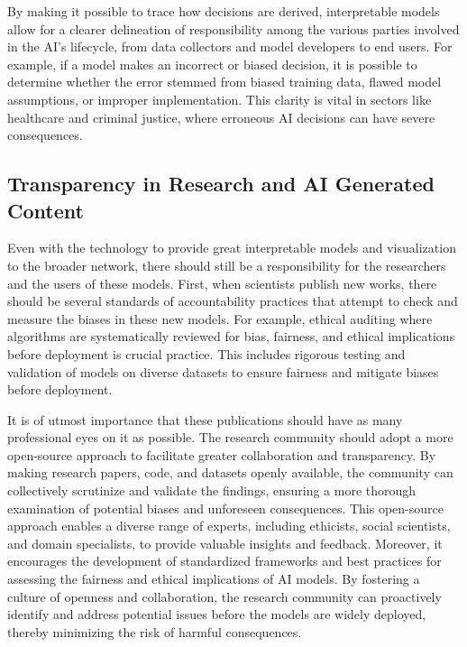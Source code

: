 \documentclass[10pt]{article}
\begin{document}
    By making it possible to trace how decisions are derived, interpretable models allow for a clearer delineation of responsibility among the various parties involved in the AI's lifecycle, from data collectors and model developers to end users. For example, if a model makes an incorrect or biased decision, it is possible to determine whether the error stemmed from biased training data, flawed model assumptions, or improper implementation. This clarity is vital in sectors like healthcare and criminal justice, where erroneous AI decisions can have severe consequences. 

  \subsection{Transparency in Research and AI Generated Content} 

    Even with the technology to provide great interpretable models and visualization to the broader network, there should still be a responsibility for the researchers and the users of these models. First, when scientists publish new works, there should be several standards of accountability practices that attempt to check and measure the biases in these new models. For example, ethical auditing where algorithms are systematically reviewed for bias, fairness, and ethical implications before deployment is crucial practice. This includes rigorous testing and validation of models on diverse datasets to ensure fairness and mitigate biases before deployment.

    It is of utmost importance that these publications should have as many professional eyes on it as possible. The research community should adopt a more open-source approach to facilitate greater collaboration and transparency. By making research papers, code, and datasets openly available, the community can collectively scrutinize and validate the findings, ensuring a more thorough examination of potential biases and unforeseen consequences. This open-source approach enables a diverse range of experts, including ethicists, social scientists, and domain specialists, to provide valuable insights and feedback. Moreover, it encourages the development of standardized frameworks and best practices for assessing the fairness and ethical implications of AI models. By fostering a culture of openness and collaboration, the research community can proactively identify and address potential issues before the models are widely deployed, thereby minimizing the risk of harmful consequences.
\end{document}
